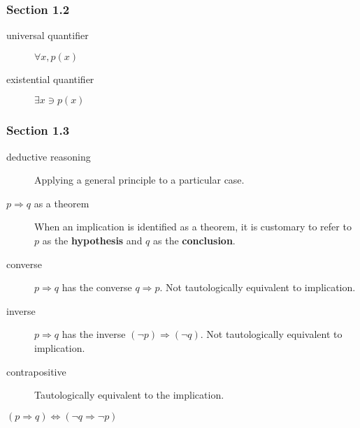\documentclass[12pt]{article}
\begin{document}
\subsubsection{Section 1.2}
\label{sec:orga927907}
\begin{description}
\item[{universal quantifier}] \(\forall{}x,p(x)\)
\item[{existential quantifier}] \(\exists{}x\ni{}p(x)\)
\end{description}

\subsubsection{Section 1.3}
\label{sec:orgaa554cd}
\begin{description}
\item[{deductive reasoning}] Applying a general principle to a particular case.
\item[{\(p\Rightarrow{}q\) as a theorem}] When an implication is identified as a theorem, it is
customary to refer to \(p\) as the \textbf{hypothesis} and \(q\) as the \textbf{conclusion}.
\item[{converse}] \(p\Rightarrow{}q\) has the converse \(q\Rightarrow{}p\). Not tautologically equivalent to
implication.
\item[{inverse}] \(p\Rightarrow{}q\) has the inverse \((\neg{}p)\Rightarrow{}(\neg{}q)\). Not tautologically
equivalent to implication.
\item[{contrapositive}] Tautologically equivalent to the implication.
\end{description}
\begin{center}
\((p\Rightarrow{}q)\Leftrightarrow(\neg{}q\Rightarrow{}\neg{}p)\)
\end{center}
\end{document}
